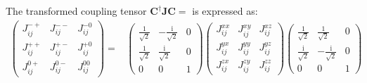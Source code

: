 \documentclass[aps, prx, nofootinbib, superscriptaddress]{revtex4-2}
\newcommand{\ri}{\mathrm{i}}
\begin{document}
The transformed coupling tensor $\mathbf{C}^{\dagger} \mathbf{J} \mathbf{C} = $ is expressed as:
\begin{equation}
    \begin{split}
    \begin{pmatrix}
        J^{-+}_{ij} & J^{--}_{ij} & J^{-0}_{ij} \\[0.3em]
        J^{++}_{ij} & J^{+-}_{ij} & J^{+0}_{ij} \\[0.3em]
        J^{0+}_{ij} & J^{0-}_{ij} & J^{00}_{ij}
    \end{pmatrix}
    = &
    \begin{pmatrix}
        \frac{1}{\sqrt{2}}   & - \frac{\ri}{\sqrt{2}}   &   0   \\[0.3em]
        \frac{1}{\sqrt{2}}   &   \frac{\ri}{\sqrt{2}}   &   0   \\[0.3em]
                0     &         0       &   1   
    \end{pmatrix} 
    \begin{pmatrix}
        J^{xx}_{ij}   &   J^{xy}_{ij}   &   J^{xz}_{ij}   \\[0.3em]
        J^{yx}_{ij}   &   J^{yy}_{ij}   &   J^{yz}_{ij}   \\[0.3em]
        J^{zx}_{ij}   &   J^{zy}_{ij}   &   J^{zz}_{ij}   
    \end{pmatrix}
    \begin{pmatrix}
        \frac{1}{\sqrt{2}}   &   \frac{1}{\sqrt{2}}   &   0   \\[0.3em]
        \frac{\ri}{\sqrt{2}}   & - \frac{\ri}{\sqrt{2}}   &   0   \\[0.3em]
                0     &         0       &   1
    \end{pmatrix}
    \end{split}
\end{equation}
\end{document}
